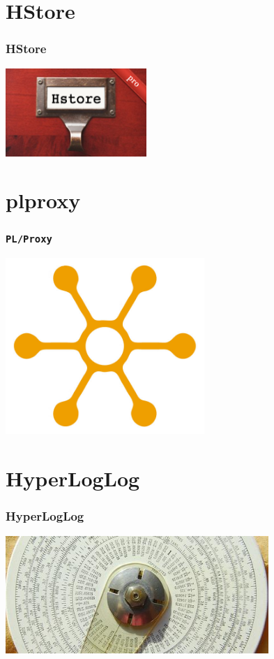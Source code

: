\documentclass{beamer}
\begin{document}
\section{HStore}

\begin{frame}[fragile]
  \frametitle{HStore}

\begin{center}
  \includegraphics[height=9em]{hstore.png}
\end{center}
\end{frame}

\section{plproxy}

\begin{frame}[fragile]
  \frametitle{\texttt{PL/Proxy}}

\begin{center}
  \includegraphics[height=18em]{distribution.jpg}
\end{center}
\end{frame}

\section{HyperLogLog}

\begin{frame}[fragile]
  \frametitle{HyperLogLog}

  \vfill

\begin{center}
  \includegraphics[height=12em]{cardinality1.jpg}
\end{center}
\end{frame}
\end{document}
